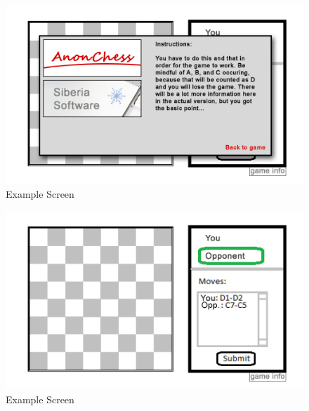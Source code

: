 \begin{figure}[H]
   \centering
   \includegraphics[scale=1.0]{screenshot4.jpg}
   \caption{Example Screen}
  \end{figure}

\begin{figure}[H]
   \centering
   \includegraphics[scale=1.0]{screenshot6.jpg}
   \caption{Example Screen}
  \end{figure}


